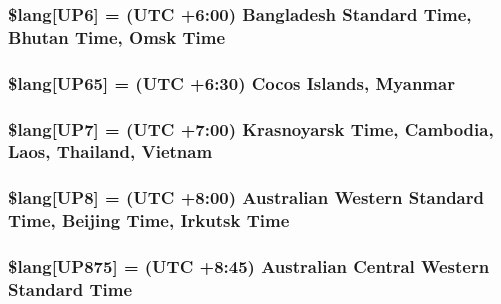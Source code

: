 \subsubsection[{\$lang}]{\setlength{\rightskip}{0pt plus 5cm}\$lang\mbox{[}\textquotesingle{}U\+P6\textquotesingle{}\mbox{]} = \textquotesingle{}(U\+T\+C +6\+:00) Bangladesh Standard Time, Bhutan Time, Omsk Time\textquotesingle{}}\label{date__lang_8php_aaa655de76a3be875d9cedbf4a57244fa}
\hypertarget{date__lang_8php_af94f885b6e6c50abdf7672ddfa80774d}{}
\subsubsection[{\$lang}]{\setlength{\rightskip}{0pt plus 5cm}\$lang\mbox{[}\textquotesingle{}U\+P65\textquotesingle{}\mbox{]} = \textquotesingle{}(U\+T\+C +6\+:30) Cocos Islands, Myanmar\textquotesingle{}}\label{date__lang_8php_af94f885b6e6c50abdf7672ddfa80774d}
\hypertarget{date__lang_8php_aeedffaf1d3a16a41e881d85c420482ce}{}
\subsubsection[{\$lang}]{\setlength{\rightskip}{0pt plus 5cm}\$lang\mbox{[}\textquotesingle{}U\+P7\textquotesingle{}\mbox{]} = \textquotesingle{}(U\+T\+C +7\+:00) Krasnoyarsk Time, Cambodia, Laos, Thailand, Vietnam\textquotesingle{}}\label{date__lang_8php_aeedffaf1d3a16a41e881d85c420482ce}
\hypertarget{date__lang_8php_a2a828a680158ca4cfb7fba60f35c67a3}{}
\subsubsection[{\$lang}]{\setlength{\rightskip}{0pt plus 5cm}\$lang\mbox{[}\textquotesingle{}U\+P8\textquotesingle{}\mbox{]} = \textquotesingle{}(U\+T\+C +8\+:00) Australian Western Standard Time, Beijing Time, Irkutsk Time\textquotesingle{}}\label{date__lang_8php_a2a828a680158ca4cfb7fba60f35c67a3}
\hypertarget{date__lang_8php_a486696d3d41c5d263a8b550903052ecb}{}
\subsubsection[{\$lang}]{\setlength{\rightskip}{0pt plus 5cm}\$lang\mbox{[}\textquotesingle{}U\+P875\textquotesingle{}\mbox{]} = \textquotesingle{}(U\+T\+C +8\+:45) Australian Central Western Standard Time\textquotesingle{}}\label{date__lang_8php_a486696d3d41c5d263a8b550903052ecb}
\hypertarget{date__lang_8php_aa112bfd057369e5adb437c55457c9f79}{}
